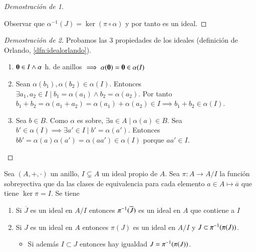 \begin{proof}[Demostración de 1]
	\begin{figure}[h]
		\centering
	\end{figure}
	Observar que $\alpha^{-1}(J) = \ker (\pi \circ \alpha)$ y por tanto es un ideal.
\end{proof}

\begin{proof}[Demostración de 2]
	Probamos las 3 propiedades de los ideales (definición de Orlando, \autoref{dfn:idealorlando}).
	\begin{enumerate}
		\item $\mathbf{0} \in I \land \alpha$ h. de anillos $\implies \alpha(\mathbf{0}) = \mathbf{0} \in \alpha(I)$
		\item Sean $\alpha(b_1), \alpha(b_2) \in \alpha(I)$. Entonces $\exists a_1, a_2 \in I \mid b_1 = \alpha(a_1) \land b_2 = \alpha(a_2)$. Por tanto $b_1 + b_2 = \alpha(a_1 + a_2) = \alpha(a_1) + \alpha(a_2) \in I \implies b_1 + b_2 \in \alpha(I)$.
		\item Sea $b \in B$. Como $\alpha$ es sobre, $\exists a \in A \mid \alpha(a) \in B$. Sea $b' \in \alpha(I) \implies \exists a' \in I \mid b' = \alpha(a')$. Entonces $bb' = \alpha(a) \alpha(a') = \alpha(aa') \in \alpha(I)$ porque $aa' \in I$.
	\end{enumerate}
\end{proof}

\begin{pro}
	\label{pro:correspondenciaideales2}
	Sea $(A, +, \cdot)$ un anillo, $I \subsetneq A$ un ideal propio de $A$. Sea $\pi: A \to A/I$ la función sobreyectiva que da las clases de equivalencia para cada elemento $a \in A \mapsto \overline{a}$ que tiene $\ker \pi = I$. Se tiene
	\begin{enumerate}
		\item Si $\overline{J}$ es un ideal en $A/I$ entonces $\pi^{-1}(\overline{J})$ es un ideal en $A$ que contiene a $I$
		\item Si $J$ es un ideal en $A$ entonces $\pi(J)$ es un ideal en $A/I$ y $J \subset \pi^{-1}(\pi(J))$.
		\begin{itemize}
			\item Si además $I \subset J$ entonces hay igualdad $J = \pi^{-1}(\pi(J))$.
		\end{itemize}
	\end{enumerate}
\end{pro}

